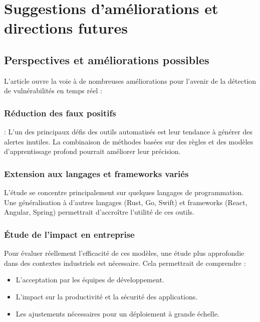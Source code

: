 \chapter{Suggestions d'améliorations et directions futures}



\section{Perspectives et améliorations possibles}



L’article ouvre la voie à de nombreuses améliorations pour l’avenir de la détection de
vulnérabilités en temps réel :




 \subsection{Réduction des faux positifs} : L’un des principaux défis des outils
     automatisés est leur tendance à générer des alertes inutiles. La
     combinaison de méthodes basées sur des règles et des modèles
     d’apprentissage profond pourrait améliorer leur précision.



\subsection{Extension aux langages et frameworks variés}

L’étude se concentre principalement sur quelques langages de programmation. Une
généralisation à d’autres langages (Rust, Go, Swift) et frameworks (React,
Angular, Spring) permettrait d’accroître l’utilité de ces outils.

\subsection{Étude de l’impact en entreprise}

Pour évaluer
réellement l’efficacité de ces modèles, une étude plus approfondie dans des
contextes industriels est nécessaire. Cela permettrait de comprendre :

\begin{itemize}

 \item L’acceptation
     par les équipes de développement.

 \item L’impact
     sur la productivité et la sécurité des applications.

 \item Les
     ajustements nécessaires pour un déploiement à grande échelle.

\end{itemize}



